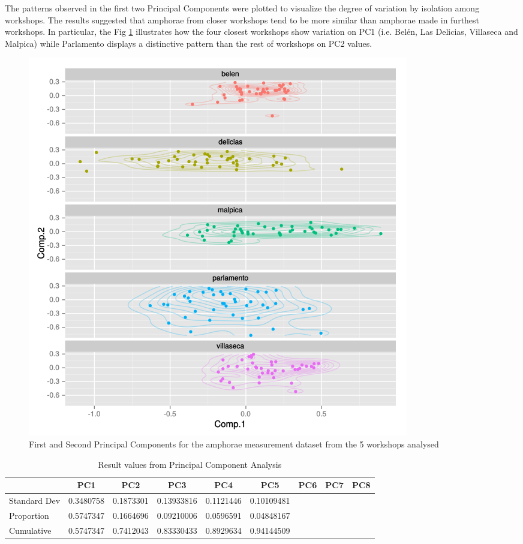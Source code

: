 \documentclass[review]{elsarticle}
\begin{document}
The patterns observed in the first two Principal Components were plotted to visualize the degree of variation by isolation among workshops. The results suggested that amphorae from closer workshops tend to be more similar than amphorae made in furthest workshops. In particular, the Fig \ref{pca} illustrates how the four closest workshops show variation on PC1 (i.e. Bel\'en, Las Delicias, Villaseca and Malpica) while Parlamento displays a distinctive pattern than the rest of workshops on PC2 values. 

\begin{figure}[htp]
	\centering
\includegraphics[scale=0.47]{pca.png}
\caption{First and Second Principal Components for the amphorae measurement dataset from the 5 workshops analysed}
\label{pca}
\end{figure} 


\begin{table}[htp]
\begin{tabular}{lcccccccc}
\hline
      		&  PC1 & PC2	& PC3 & PC4 & PC5 & PC6 & PC7 & PC8     \\ \hline
Standard Dev&0.3480758&0.1873301&0.13933816&0.1121446&0.10109481&	    &     &           \\
Proportion  &0.5747347&0.1664696&0.09210006&0.0596591&0.04848167&	    &     &           \\
Cumulative  &0.5747347&0.7412043&0.83330433&0.8929634&0.94144509&     &     &           \\

\end{tabular}
\caption{Result values from Principal Component Analysis}
\label{table:spatgeo}
\end{table}
\end{document}
